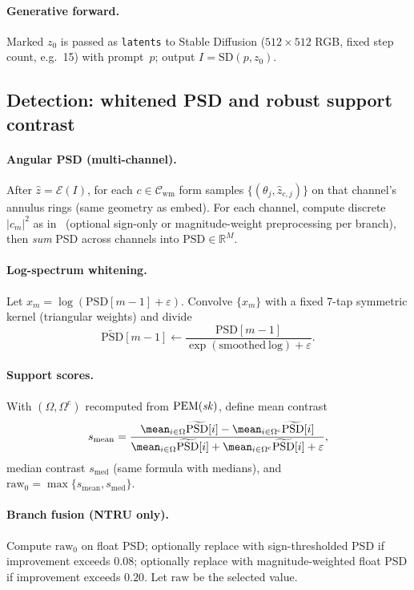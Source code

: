 \paragraph{Generative forward.}
Marked $z_0$ is passed as \texttt{latents} to Stable Diffusion ($512\times512$ RGB,
fixed step count, e.g.\ 15) with prompt~$p$; output $I=\mathrm{SD}(p,z_0)$.

\subsection{Detection: whitened PSD and robust support contrast}
\label{sec:b3-detect}

\paragraph{Angular PSD (multi-channel).}
After $\hat z=\mathcal{E}(I)$, for each $c\in\mathcal{C}_{\mathrm{wm}}$ form samples
$\{(\theta_j,\hat z_{c,j})\}$ on that channel's annulus rings (same geometry as embed).
For each channel, compute discrete $|c_m|^2$ as in~
(optional sign-only or magnitude-weight preprocessing per branch), then \emph{sum}
PSD across channels into $\mathrm{PSD}\in\mathbb{R}^M$.

\paragraph{Log-spectrum whitening.}
Let $x_m=\log(\mathrm{PSD}[m-1]+\varepsilon)$. Convolve $\{x_m\}$ with a fixed
7-tap symmetric kernel (triangular weights) and divide
\[
\widetilde{\mathrm{PSD}}[m-1]
\leftarrow \frac{\mathrm{PSD}[m-1]}{\exp(\mathrm{smoothed\ log})+\varepsilon}.
\]

\paragraph{Support scores.}
With $(\Omega,\Omega^{\mathrm c})$ recomputed from $\mathrm{PEM}(\mathit{sk})$, define
mean contrast
\[
s_{\mathrm{mean}}=
\frac{\mean_{i\in\Omega}\widetilde{\mathrm{PSD}}[i]
-\mean_{i\in\Omega^{\mathrm c}}\widetilde{\mathrm{PSD}}[i]}
{\mean_{i\in\Omega}\widetilde{\mathrm{PSD}}[i]
+\mean_{i\in\Omega^{\mathrm c}}\widetilde{\mathrm{PSD}}[i]+\varepsilon},
\]
median contrast $s_{\mathrm{med}}$ (same formula with medians), and
$\mathrm{raw}_0=\max\{s_{\mathrm{mean}},s_{\mathrm{med}}\}$.

\paragraph{Branch fusion (NTRU only).}
Compute $\mathrm{raw}_0$ on float PSD; optionally replace with sign-thresholded PSD
if improvement exceeds $0.08$; optionally replace with magnitude-weighted float PSD
if improvement exceeds $0.20$. Let $\mathrm{raw}$ be the selected value.

